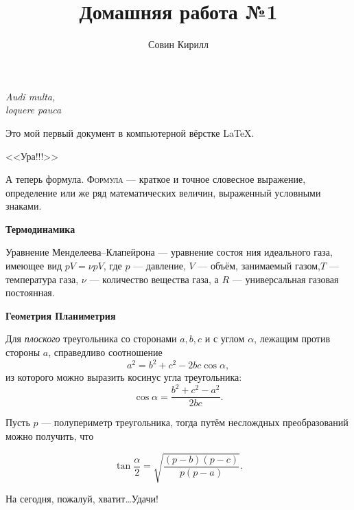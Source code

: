 \documentclass[12pt]{article}
\title{Домашняя работа №1}
\author{Совин Кирилл}
\date{}
\begin{document}
	\maketitle
\begin{flushright}
\textit{Audi multa,\\
	loquere pauca}	
\end{flushright}

\vspace{20pt}

Это мой первый документ в компьютерной вёрстке \LaTeX.

\begin{center}
\huge{ \textsf{<<Ура!!!>>} }\\
\end{center}

\par А теперь формула. \textsc{Формула} --- краткое и точное словесное выражение, определение или же ряд математических величин, выраженный условными знаками.
\vspace{15pt}

\hspace{28pt}  {\Large\textbf{Термодинамика}}

\par Уравнение Менделеева--Клапейрона --- уравнение состоя
ния идеального газа, имеющее вид $pV = \nu pV$, где $p$ --- давление, $V$ --- объём, занимаемый газом,$T$ --- температура газа, $\nu$ --- количество вещества газа, а $R$ --- универсальная газовая постоянная.
\vspace{15pt}

\hspace{28pt}  {\Large\textbf{Геометрия \hfill Планиметрия}}

\par Для \textit{плоского} треугольника со сторонами $a, b, c$ и с углом $\alpha$, лежащим против стороны $a$, справедливо соотношение
$$
a^2 = b^2 + c^2 - 2bc \cos \alpha,
$$
из которого можно выразить косинус угла треугольника:
$$
\cos \alpha =\frac {b^2 + c^2 - a^2} {2bc}.
$$

Пусть $p$ --- полупериметр треугольника, тогда путём неслождных преобразований можно получить, что

$$
\tan \frac \alpha 2 = \sqrt{\frac {(p-b)(p -c)} {p(p-a)} }.
$$

\begin{flushleft} %
На сегодня, пожалуй, хватит\dots Удачи!
\end{flushleft}
\end{document}
